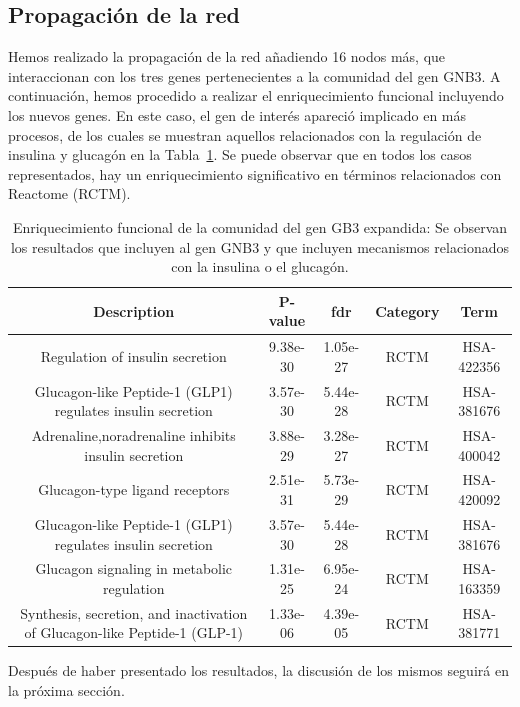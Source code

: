 \subsection{Propagación de la red}

Hemos realizado la propagación de la red añadiendo 16 nodos más, que interaccionan con los tres genes pertenecientes a la comunidad del gen GNB3. A continuación, hemos procedido a realizar el enriquecimiento funcional incluyendo los nuevos genes. En este caso, el gen de interés apareció implicado en más procesos, de los cuales se muestran aquellos relacionados con la regulación de insulina y glucagón en la Tabla~\ref{table:enriquecimiento2}. Se puede observar que en todos los casos representados, hay un enriquecimiento significativo en términos relacionados con Reactome (RCTM).


\begin{table}[h]
	\centering
	\begin{tabular}{|c|c|c|c|c|}
		\hline
		 Description & P-value & fdr & Category & Term \\ \hline
		 Regulation of insulin secretion   & 9.38e-30 & 1.05e-27 &  RCTM & HSA-422356 \\ \hline
		 Glucagon-like Peptide-1 (GLP1) regulates insulin secretion  & 3.57e-30 & 5.44e-28 &  RCTM & HSA-381676 \\ \hline
		 Adrenaline,noradrenaline inhibits insulin secretion & 3.88e-29 & 3.28e-27 &  RCTM & HSA-400042 \\ \hline
		 Glucagon-type ligand receptors & 2.51e-31 & 5.73e-29 &  RCTM & HSA-420092 \\ \hline
		 Glucagon-like Peptide-1 (GLP1) regulates insulin secretion & 3.57e-30 & 5.44e-28 &  RCTM & HSA-381676 \\ \hline
		 Glucagon signaling in metabolic regulation & 1.31e-25 & 6.95e-24 &  RCTM & HSA-163359 \\ \hline
		 Synthesis, secretion, and inactivation of Glucagon-like Peptide-1 (GLP-1) & 1.33e-06 & 4.39e-05 &  RCTM & HSA-381771 \\ \hline
	\end{tabular}
	\caption{Enriquecimiento funcional de la comunidad del gen GB3 expandida: Se observan los resultados que incluyen al gen GNB3 y que incluyen mecanismos relacionados con la insulina o el glucagón.}
	\label{table:enriquecimiento2}
\end{table}

Después de haber presentado los resultados, la discusión de los mismos seguirá en la próxima sección.
